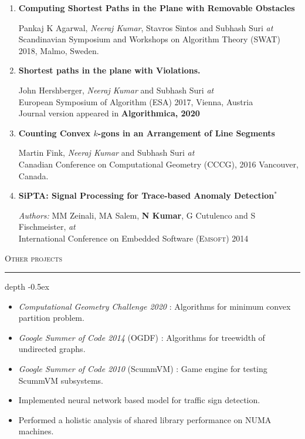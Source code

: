 \documentclass[11pt]{article}
\def\Vhrulefill{\leavevmode\leaders\hrule height 1.2ex depth \dimexpr2pt-0.5ex\hfill\kern0pt}
\begin{document}
{\begin{enumerate}
    \item \textbf{Computing Shortest Paths in the Plane with Removable Obstacles}
        
				Pankaj K Agarwal, \emph{Neeraj Kumar}, Stavros Sintos and Subhash Suri \emph{at} \\
				Scandinavian Symposium and Workshops on Algorithm Theory (SWAT) 2018, Malmo, Sweden.
    
    \item \textbf{Shortest paths in the plane with Violations.}
        
				John Hershberger, \emph{Neeraj Kumar} and Subhash Suri \emph{at} \\
        European Symposium of Algorithm (ESA) 2017, Vienna, Austria\\
				Journal version appeared in \textbf{Algorithmica, 2020}

    \item \textbf{Counting Convex $k$-gons in an Arrangement of Line Segments} 
        
				Martin Fink, \emph{Neeraj Kumar} and Subhash Suri \emph{at} \\
        Canadian Conference on Computational Geometry (CCCG), 2016 Vancouver, Canada.

    \item \textbf{SiPTA: Signal Processing for Trace-based Anomaly Detection$^*$}
        
				\emph{Authors:} MM Zeinali, MA Salem, \textbf{N Kumar}, G Cutulenco and S Fischmeister, \emph{at}\\
				International Conference on Embedded Software \textsc{(Emsoft)} 2014
\end{enumerate}

\medskip
\noindent\textsc{Other projects}
\textcolor{mygray}{\noindent\Vhrulefill}
\begin{itemize}
	\item \emph{Computational Geometry Challenge 2020} : Algorithms for minimum convex partition problem.
	\item \emph{Google Summer of Code 2014} (OGDF) : Algorithms for treewidth of undirected graphs.
	\item \emph{Google Summer of Code 2010} (ScummVM) : Game engine for testing ScummVM subsystems.
	\item Implemented neural network based model for traffic sign detection.
	\item Performed a holistic analysis of shared library performance on NUMA machines.
\\
\end{itemize}

}
\end{document}
